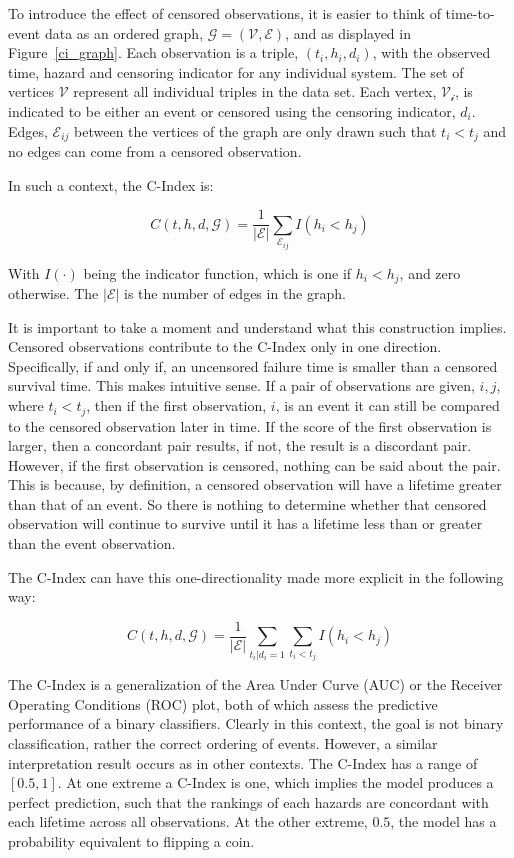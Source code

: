 To introduce the effect of censored observations, it is easier to think of time-to-event data as an ordered graph, $\mathcal{G} = (\mathcal{V}, \mathcal{E})$, and as displayed in Figure~\ref{ci_graph}\cite{Steck2008}. Each observation is a triple, $(t_i, h_i, d_i)$, with the observed time, hazard and censoring indicator for any individual system. The set of vertices $\mathcal{V}$ represent all individual triples in the data set. Each vertex, $\mathcal{V_i}$, is indicated to be either an event or censored using the censoring indicator, $d_i$. Edges, $\mathcal{E}_{ij}$ between the vertices of the graph are only drawn such that $t_i < t_j$ and no edges can come from a censored observation.

In such a context, the C-Index is:

$$ C(t, h, d, \mathcal{G}) = \frac{1}{\mathcal{|E|}} \sum_{\mathcal{E}_{ij}} I(h_i < h_j) $$

With $I(\cdot)$ being the indicator function, which is one if $h_i < h_j$, and zero otherwise. The $\mathcal{|E|}$ is the number of edges in the graph.

It is important to take a moment and understand what this construction implies. Censored observations contribute to the C-Index only in one direction. Specifically, if and only if, an uncensored failure time is smaller than a censored survival time. This makes intuitive sense. If a pair of observations are given, $i,j$, where $t_i < t_j$, then if the first observation, $i$, is an event it can still be compared to the censored observation later in time. If the score of the first observation is larger, then a concordant pair results, if not, the result is a discordant pair. However, if the first observation is censored, nothing can be said about the pair. This is because, by definition, a censored observation will have a lifetime greater than that of an event. So there is nothing to determine whether that censored observation will continue to survive until it has a lifetime less than or greater than the event observation. 

The C-Index can have this one-directionality made more explicit in the following way\cite{Steck2008}:

$$ C(t, h, d, \mathcal{G}) = \frac{1}{\mathcal{|E|}} \sum_{t_{i}|d_i = 1} \sum_{t_i < t_j} I(h_i < h_j) $$

The C-Index is a generalization of the Area Under Curve (AUC) or the Receiver Operating Conditions (ROC) plot, both of which assess the predictive performance of a binary classifiers\cite{Cook2007}\cite{Tripepi2010}. Clearly in this context, the goal is not binary classification, rather the correct ordering of events. However, a similar interpretation result occurs as in other contexts. The C-Index has a range of $[0.5,1]$. At one extreme a C-Index is one, which implies the model produces a perfect prediction, such that the rankings of each hazards are concordant with each lifetime across all observations. At the other extreme, $0.5$, the model has a probability equivalent to flipping a coin. 

